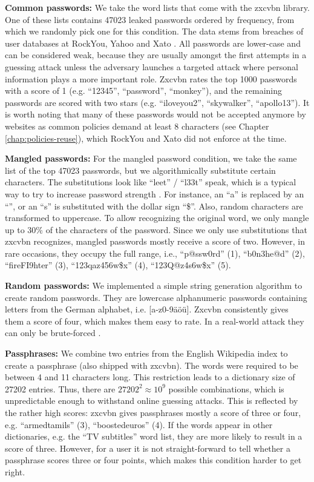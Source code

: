 \textbf{Common passwords: } We take the word lists that come with the zxcvbn library. One of these lists contains 47023 leaked passwords ordered by frequency, from which we randomly pick one for this condition. The data stems from breaches of user databases at RockYou, Yahoo and Xato \cite{Wheeler2016zxcvbn}. All passwords are lower-case and can be considered weak, because they are usually amongst the first attempts in a guessing attack \cite{Ur2015MeasuringRealWorldAccuracies} unless the adversary launches a targeted attack where personal information plays a more important role. Zxcvbn rates the top 1000 passwords with a score of 1 (e.g. ``12345'', ``password'', ``monkey''), and the remaining passwords are scored with two stars (e.g. ``iloveyou2'', ``skywalker'', ``apollo13''). It is worth noting that many of these passwords would not be accepted anymore by websites as common policies demand at least 8 characters (see Chapter \ref{chap:policies-reuse}), which RockYou and Xato did not enforce at the time. %


\textbf{Mangled passwords: } For the mangled password condition, we take the same list of the top 47023 passwords, but we algorithmically substitute certain characters. The substitutions look like ``leet''  / ``l33t'' speak, which is a typical way to try to increase password strength \cite{Das2014TangledWeb, Mazurek2013Measuring}. For instance, an ``a'' is replaced by an ``\@'', or an ``s'' is substituted with the dollar sign ``\$''. Also, random characters are transformed to uppercase. To allow recognizing the original word, we only mangle up to 30\% of the characters of the password. Since we only use substitutions that zxcvbn recognizes, mangled passwords mostly receive a score of two. However, in rare occasions, they occupy the full range, i.e., ``p@ssw0rd'' (1), ``b0n3he@d'' (2), ``fireFI9hter'' (3), ``123qaz456w\$x'' (4), ``123Q@z4s6w\$x'' (5). 


\textbf{Random passwords: } We implemented a simple string generation algorithm to create random passwords. They are lowercase alphanumeric passwords containing letters from the German alphabet, i.e. [a-z0-9äöü]. Zxcvbn consistently gives them a score of four, which makes them easy to rate. In a real-world attack they can only be brute-forced \cite{Florencio2014AdministratorsGuide, Wheeler2016zxcvbn}.


\textbf{Passphrases: } We combine two entries from the English Wikipedia index to create a passphrase (also shipped with zxcvbn). The words were required to be between 4 and 11 characters long. This restriction leads to a dictionary size of 27202 entries. Thus, there are $27202^2 \approx 10^9$ possible combinations, which is unpredictable enough to withstand online guessing attacks. This is reflected by the rather high scores: zxcvbn gives passphrases mostly a score of three or four, e.g. ``armedtamils'' (3), ``boostedeuros'' (4). If the words appear in other dictionaries, e.g. the ``TV subtitles'' word list, they are more likely to result in a score of three. However, for a user it is not straight-forward to tell whether a passphrase scores three or four points, which makes this condition harder to get right. 

